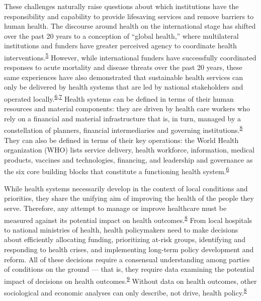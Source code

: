 \documentclass[
]{article}
\begin{document}
These challenges naturally raise questions about which institutions have the responsibility and capability to provide lifesaving services and remove barriers to human health. The discourse around health on the international stage has shifted over the past 20 years to a conception of ``global health,'' where multilateral institutions and funders have greater perceived agency to coordinate health interventions.\textsuperscript{\protect\hyperlink{ref-Brown2006}{5}} However, while international funders have successfully coordinated responses to acute mortality and disease threats over the past 20 years, these same experiences have also demonstrated that sustainable health services can only be delivered by health systems that are led by national stakeholders and operated locally.\textsuperscript{\protect\hyperlink{ref-WorldHealthOrganization2007}{6},\protect\hyperlink{ref-WorldHealthOrganization2010}{7}} Health systems can be defined in terms of their human resources and material components: they are driven by health care workers who rely on a financial and material infrastructure that is, in turn, managed by a constellation of planners, financial intermediaries and governing institutions.\textsuperscript{\protect\hyperlink{ref-Roberts2008}{8}} They can also be defined in terms of their key operations: the World Health organization (WHO) lists service delivery, health workforce, information, medical products, vaccines and technologies, financing, and leadership and governance as the six core building blocks that constitute a functioning health system.\textsuperscript{\protect\hyperlink{ref-WorldHealthOrganization2007}{6}}

While health systems necessarily develop in the context of local conditions and priorities, they share the unifying aim of improving the health of the people they serve. Therefore, any attempt to manage or improve healthcare must be measured against its potential impact on health outcomes.\textsuperscript{\protect\hyperlink{ref-Roberts2008}{8}} From local hospitals to national ministries of health, health policymakers need to make decisions about efficiently allocating funding, prioritizing at-risk groups, identifying and responding to health crises, and implementing long-term policy development and reform. All of these decisions require a consensual understanding among parties of conditions on the ground --- that is, they require data examining the potential impact of decisions on health outcomes.\textsuperscript{\protect\hyperlink{ref-AbouZahr2015}{9}} Without data on health outcomes, other sociological and economic analyses can only describe, not drive, health policy.\textsuperscript{\protect\hyperlink{ref-Roberts2008}{8}}
\end{document}

